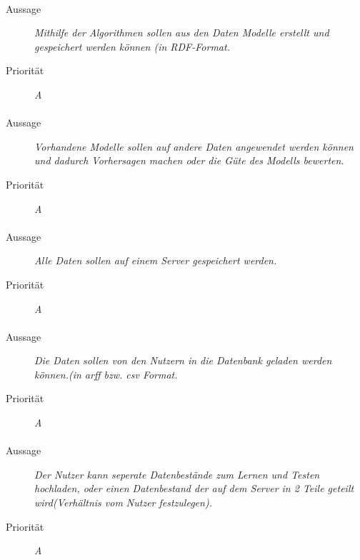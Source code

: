 \paragraph{}
\begin{description}
\item[Aussage] \textit{Mithilfe der Algorithmen sollen aus den Daten Modelle erstellt und gespeichert werden können (in RDF-Format.}
\item[Priorität] \textit{A}
\end{description}

\paragraph{}
\begin{description}
\item[Aussage] \textit{Vorhandene Modelle sollen auf andere Daten angewendet werden können und dadurch Vorhersagen machen oder die Güte des Modells bewerten.}
\item[Priorität] \textit{A}
\end{description}

\paragraph{}
\begin{description}
\item[Aussage] \textit{Alle Daten sollen auf einem Server gespeichert werden.}
\item[Priorität] \textit{A}
\end{description}

\paragraph{}
\begin{description}
\item[Aussage] \textit{Die Daten sollen von den Nutzern in die Datenbank geladen werden können.(in arff bzw. csv Format.}
\item[Priorität] \textit{A}
\end{description}


\paragraph{}
\begin{description}
\item[Aussage] \textit{Der Nutzer kann seperate Datenbestände zum Lernen und Testen hochladen, oder einen Datenbestand der auf dem Server in 2 Teile geteilt wird(Verhältnis vom Nutzer festzulegen).}
\item[Priorität] \textit{A}
\end{description}

